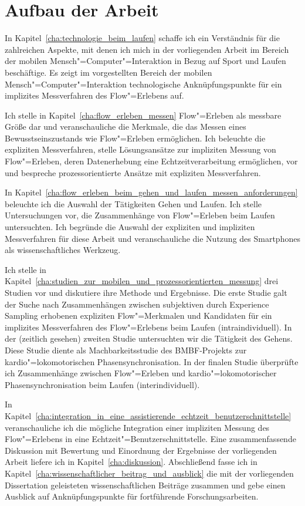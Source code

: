 

\section{Aufbau der Arbeit} 

\label{sec:aufbau_der_arbeit}

In Kapitel~\ref{cha:technologie_beim_laufen} schaffe ich ein Verständnis für die zahlreichen Aspekte, mit denen ich mich in der vorliegenden Arbeit im Bereich der mobilen Mensch"=Computer"=Interaktion in Bezug auf Sport und Laufen beschäftige. Es zeigt im vorgestellten Bereich der mobilen Mensch"=Computer"=Interaktion technologische Anknüpfungspunkte für ein implizites Messverfahren des Flow"=Erlebens auf.

Ich stelle in Kapitel~\ref{cha:flow_erleben_messen} Flow"=Erleben als messbare Größe dar und veranschauliche die Merkmale, die das Messen eines Bewusstseinszustands wie Flow"=Erleben ermöglichen. Ich beleuchte die expliziten Messverfahren, stelle Lösungsansätze zur impliziten Messung von Flow"=Erleben, deren Datenerhebung eine Echtzeitverarbeitung ermöglichen, vor und bespreche prozessorientierte Ansätze mit expliziten Messverfahren.

In Kapitel~\ref{cha:flow_erleben_beim_gehen_und_laufen_messen_anforderungen} beleuchte ich die Auswahl der Tätigkeiten Gehen und Laufen. Ich stelle Untersuchungen vor, die Zusammenhänge von Flow"=Erleben beim Laufen untersuchten. Ich begründe die Auswahl der expliziten und impliziten Messverfahren für diese Arbeit und veranschauliche die Nutzung des Smartphones als wissenschaftliches Werkzeug.

Ich stelle in Kapitel~\ref{cha:studien_zur_mobilen_und_prozessorientierten_messung} drei Studien vor und diskutiere ihre Methode und Ergebnisse. Die erste Studie galt der Suche nach Zusammenhängen zwischen subjektiven durch Experience Sampling erhobenen expliziten Flow"=Merkmalen und Kandidaten für ein implizites Messverfahren des Flow"=Erlebens beim Laufen (intraindividuell). In der (zeitlich gesehen) zweiten Studie untersuchten wir die Tätigkeit des Gehens. Diese Studie diente als Machbarkeitsstudie des \acs{BMBF}-Projekts zur kardio"=lokomotorischen Phasensynchronisation. In der finalen Studie überprüfte ich Zusammenhänge zwischen Flow"=Erleben und kardio"=lokomotorischer Phasensynchronisation beim Laufen (interindividuell). 

In Kapitel~\ref{cha:integration_in_eine_assistierende_echtzeit_benutzerschnittstelle} veranschauliche ich die mögliche Integration einer impliziten Messung des Flow"=Erlebens in eine Echtzeit"=Benutzerschnittstelle. Eine zusammenfassende Diskussion mit Bewertung und Einordnung der Ergebnisse der vorliegenden Arbeit liefere ich in Kapitel~\ref{cha:diskussion}. Abschließend fasse ich in Kapitel~\ref{cha:wissenschaftlicher_beitrag_und_ausblick} die mit der vorliegenden Dissertation geleisteten wissenschaftlichen Beiträge zusammen und gebe einen Ausblick auf Anknüpfungspunkte für fortführende Forschungsarbeiten.

